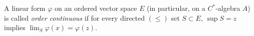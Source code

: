A linear form $\varphi$ on an ordered vector space $E$ (in particular, on a $C^*$-algebra $A$) is called \textit{order continuous} if for every directed $(\leq)$ set $S \subset E$, $\sup S = z$ implies $\lim_S \varphi(x) = \varphi(z)$.
